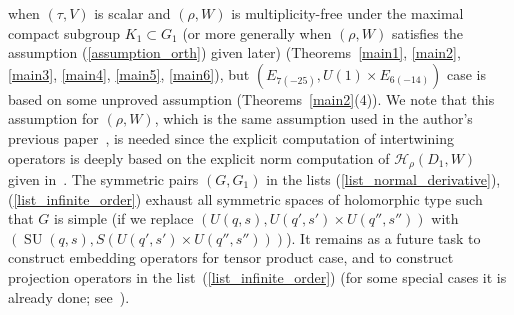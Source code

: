 \documentclass[pdftex]{sigma}
\numberwithin{equation}{section}
\newcommand{\cH}{\mathcal{H}}
\begin{document}
when $(\tau,V)$ is scalar and $(\rho,W)$ is multiplicity-free under the maximal compact subgroup $K_1\subset G_1$ (or more generally when $(\rho,W)$ satisfies the assumption (\ref{assumption_orth}) given later) (Theo\-rems~\ref{main1}, \ref{main2}, \ref{main3}, \ref{main4}, \ref{main5}, \ref{main6}), but $(E_{7(-25)},U(1)\times E_{6(-14)})$ case is based on some unproved assumption (Theorems~\ref{main2}(4)). We note that this assumption for $(\rho,W)$, which is the same assumption used in the author's previous paper~\cite{N2}, is needed since the explicit computation of intertwining operators is deeply based on the explicit norm computation of $\cH_\rho(D_1,W)$ given in~\cite{N2}. The symmetric pairs $(G,G_1)$ in the lists (\ref{list_normal_derivative}), (\ref{list_infinite_order}) exhaust all symmetric spaces of holomorphic type such that $G$ is simple (if we replace $(U(q,s), U(q',s')\times U(q'',s''))$ with $(\operatorname{SU}(q,s), S(U(q',s')\times U(q'',s'')))$). It remains as a future task to construct embedding operators for tensor product case, and to construct projection operators in the list~(\ref{list_infinite_order}) (for some special cases it is already done; see~\cite{IKO,Ju,KP2}).
\end{document}
